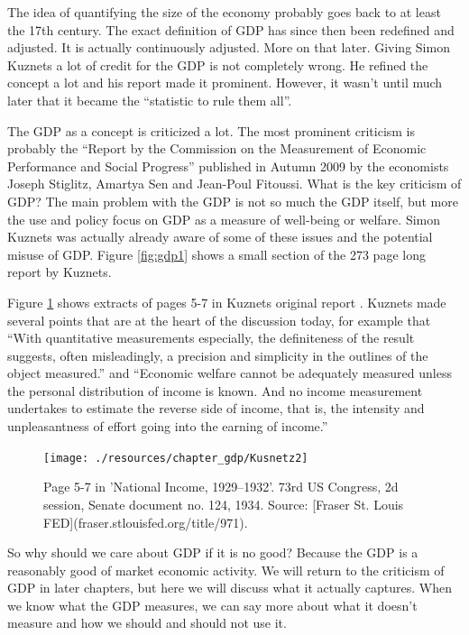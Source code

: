 \documentclass[
]{book}
\begin{document}
The idea of quantifying the size of the economy probably goes back to at least the 17th century. The exact definition of GDP has since then been redefined and adjusted. It is actually continuously adjusted. More on that later. Giving Simon Kuznets a lot of credit for the GDP is not completely wrong. He refined the concept a lot and his report made it prominent. However, it wasn't until much later that it became the ``statistic to rule them all''.

The GDP as a concept is criticized a lot. The most prominent criticism is probably the ``Report by the Commission on the Measurement of Economic Performance and Social Progress'' published in Autumn 2009 by the economists Joseph Stiglitz, Amartya Sen and Jean-Poul Fitoussi. What is the key criticism of GDP? The main problem with the GDP is not so much the GDP itself, but more the use and policy focus on GDP as a measure of well-being or welfare. Simon Kuznets was actually already aware of some of these issues and the potential misuse of GDP. Figure \ref{fig:gdp1} shows a small section of the 273 page long report by Kuznets.

Figure \ref{fig:gdp2} shows extracts of pages 5-7 in Kuznets original report \citep{kuznets1934national}. Kuznets made several points that are at the heart of the discussion today, for example that ``With quantitative measurements especially, the definiteness of the result suggests, often misleadingly, a precision and simplicity in the outlines of the object measured.'' and ``Economic welfare cannot be adequately measured unless the personal distribution of income is known. And no income measurement undertakes to estimate the reverse side of income, that is, the intensity and unpleasantness of effort going into the earning of income.''

\begin{figure}

{\centering \texttt{[image: ./resources/chapter\_gdp/Kusnetz2]} 

}

\caption{Page 5-7 in 'National Income, 1929–1932'. 73rd US Congress, 2d session, Senate document no. 124, 1934. Source:  [Fraser St. Louis FED](fraser.stlouisfed.org/title/971). }\label{fig:gdp2}
\end{figure}

So why should we care about GDP if it is no good? Because the GDP is a reasonably good of market economic activity. We will return to the criticism of GDP in later chapters, but here we will discuss what it actually captures. When we know what the GDP measures, we can say more about what it doesn't measure and how we should and should not use it.
\end{document}
